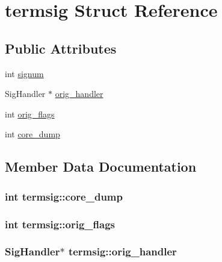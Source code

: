 \hypertarget{structtermsig}{}\section{termsig Struct Reference}
\label{structtermsig}
\subsection*{Public Attributes}
\begin{DoxyCompactItemize}
\item 
int \hyperlink{structtermsig_aa38dcc7e498d80724e4541257c8726e5}{signum}
\item 
Sig\+Handler $\ast$ \hyperlink{structtermsig_acb5d5b0df319b86416c9d680eab43306}{orig\+\_\+handler}
\item 
int \hyperlink{structtermsig_aa2dff43019910caaeed967ae1e8212e4}{orig\+\_\+flags}
\item 
int \hyperlink{structtermsig_abdf0a75a550ac053320410c6e8976afe}{core\+\_\+dump}
\end{DoxyCompactItemize}


\subsection{Member Data Documentation}
\subsubsection[{\texorpdfstring{core\+\_\+dump}{core_dump}}]{\setlength{\rightskip}{0pt plus 5cm}int termsig\+::core\+\_\+dump}\hypertarget{structtermsig_abdf0a75a550ac053320410c6e8976afe}{}\label{structtermsig_abdf0a75a550ac053320410c6e8976afe}
\subsubsection[{\texorpdfstring{orig\+\_\+flags}{orig_flags}}]{\setlength{\rightskip}{0pt plus 5cm}int termsig\+::orig\+\_\+flags}\hypertarget{structtermsig_aa2dff43019910caaeed967ae1e8212e4}{}\label{structtermsig_aa2dff43019910caaeed967ae1e8212e4}
\subsubsection[{\texorpdfstring{orig\+\_\+handler}{orig_handler}}]{\setlength{\rightskip}{0pt plus 5cm}Sig\+Handler$\ast$ termsig\+::orig\+\_\+handler}\hypertarget{structtermsig_acb5d5b0df319b86416c9d680eab43306}{}\label{structtermsig_acb5d5b0df319b86416c9d680eab43306}
